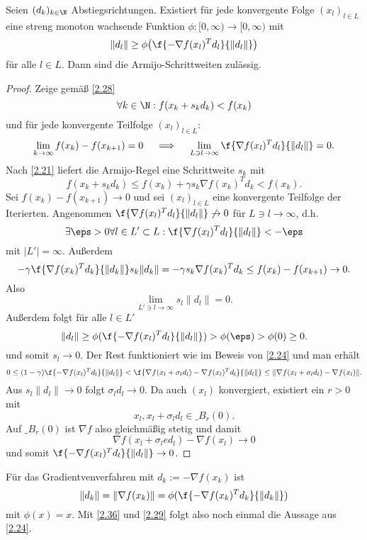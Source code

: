 \begin{st} \label{2.36}
	Seien $(d_k)_{k\in\N}$ Abstiegsrichtungen.
	Existiert für jede konvergente Folge $(x_l)_{l\in L}$ eine streng monoton wachsende Funktion $\phi: [0,\infty) \to [0,\infty)$ mit
	\[
		\|d_l\|
		\ge \phi \big( \f{-\nabla f(x_l)^T d_l}{\|d_l\|} \big)
	\]
	für alle $l \in L$.
	Dann sind die Armijo-Schrittweiten zulässig.
	\begin{proof}
		Zeige gemäß \ref{2.28}
		\[
			\forall k\in\N : f(x_k + s_k d_k) < f(x_k)
		\]
		und für jede konvergente Teilfolge $(x_l)_{l\in L}$:
		\[
			\lim_{k\to\infty} f(x_k) - f(x_{k+1}) = 0
			\quad \implies\quad
			\lim_{L \ni l \to \infty} \f{\nabla f(x_l)^T d_l}{\|d_l\|} = 0.
		\]
		Nach \ref{2.21} liefert die Armijo-Regel eine Schrittweite $s_k$ mit
		\[
			f(x_k + s_k d_k)
			\le f(x_k) + \gamma s_k \nabla f(x_k)^T d_k
			< f(x_k).
		\]
		Sei $f(x_k) - f(x_{k+1}) \to 0$ und sei $(x_l)_{l\in L}$ eine konvergente Teilfolge der Iterierten.
		Angenommen $\f {\nabla f(x_l)^T d_l}{\|d_l\|} \not\to 0$ für $L \ni l \to \infty$, d.h.
		\[
			\exists \eps > 0 \forall l \in L' \subset L : \f{\nabla f(x_l)^T d_l}{\|d_l\|} < - \eps
		\]
		mit $|L'| = \infty$.
		Außerdem
		\[
			-\gamma \f {\nabla f(x_k)^T d_k}{\|d_k\|} s_k \|d_k\|
			= - \gamma s_k \nabla f(x_k)^T d_k
			\le	f(x_k) - f(x_{k+1})
			\to 0.
		\]
		Also
		\[
			\lim_{L' \ni l \to \infty} s_l \|d_l\| = 0.
		\]
		Außerdem folgt für alle $l \in L'$
		\[
			\|d_l\|
			\ge \phi(\f{-\nabla f(x_l)^T d_l}{\|d_l\|})
			> \phi(\eps)
			> \phi(0)
			\ge 0.
		\]
		und somit $s_l \to 0$.
		Der Rest funktioniert wie im Beweis von \ref{2.24} und man erhält
		\[
			0
			\le (1-\gamma) \f {-\nabla f(x_l)^T d_l}{\|d_l\|}
			< \f {\nabla f(x_l+ \sigma_l d_l) - \nabla f(x_l)^Td_l}{\|d_l\|}
			\le \|\nabla f(x_l + \sigma_l d_l) - \nabla f(x_l)\|.
		\]
		Aus $s_l \|d_l\| \to 0$ folgt $\sigma_l d_l \to 0$.
		Da auch $(x_l)$ konvergiert, existiert ein $r > 0$ mit
		\[
			x_l, x_l + \sigma_l d_l \in \_{B_r(0)}.
		\]
		Auf $\_{B_r(0)}$ ist $\nabla f$ also gleichmäßig stetig und damit
		\[
			\nabla f(x_l + \sigma_le d_l) - \nabla f(x_l) \to 0
		\]
		und somit $\f{-\nabla f(x_l)^T d_l}{\|d_l\|} \to 0$.
	\end{proof}
\end{st}

\begin{ex} \label{2.37}
	Für das Gradientvenverfahren mit $d_k := -\nabla f(x_k)$ ist
	\[
		\|d_k\|
		=\|\nabla f(x_k)\|
		=\phi(\f{-\nabla f(x_k)^T d_k}{\|d_k\|})
	\]
	mit $\phi(x) = x$.
	Mit \ref{2.36} und \ref{2.29} folgt also noch einmal die Aussage aus \ref{2.24}.
\end{ex}

